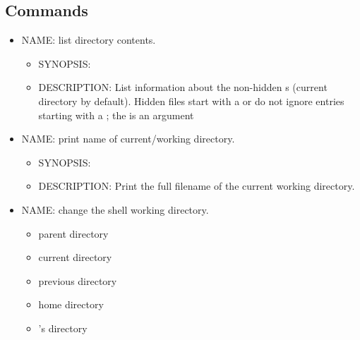 \subsection{Commands}
\begin{itemize}
      \item NAME\@:  \textrightarrow{} list directory contents.
            \begin{itemize}
                  \item SYNOPSIS\@: 
                  \item DESCRIPTION\@: List information about the non-hidden s
                        (current directory by default). Hidden files start with a 
                         or  do not ignore entries starting
                        with a ; the  is an argument
            \end{itemize}
      \item NAME\@:  \textrightarrow{} print name of current/working directory.
            \begin{itemize}
                  \item SYNOPSIS\@: 
                  \item DESCRIPTION\@: Print the full filename of the current working directory.
            \end{itemize}
      \item NAME\@:  \textrightarrow{} change the shell working directory.
            \begin{itemize}
                  \item {} \textrightarrow{} parent directory
                  \item {} \textrightarrow{} current directory
                  \item \code{-} \textrightarrow{} previous directory
                  \item \code{\textasciitilde} \textrightarrow{} home directory
                  \item {} \textrightarrow{} 's directory
            \end{itemize}
\end{itemize}
